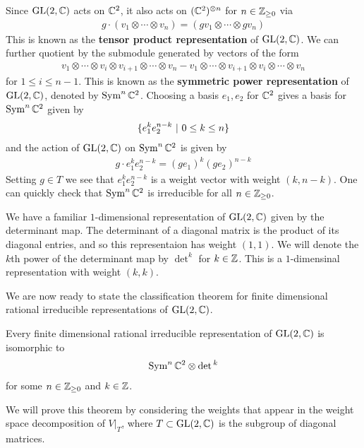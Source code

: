 \documentclass[12pt]{article}
\begin{document}
\begin{example}
Since $\operatorname{GL}(2,\mathbb{C})$ acts on $\mathbb{C}^2$, it also acts on $(\mathbb{C}^2)^{\otimes n}$ for $n\in \mathbb{Z}_{\geq 0}$ via \begin{align*}
    g\cdot (v_1\otimes \cdots \otimes v_n) = (gv_1\otimes \cdots \otimes gv_n)
\end{align*} This is known as the \textbf{tensor product representation} of $\operatorname{GL}(2,\mathbb{C})$. We can further 
quotient by the submodule generated by vectors of the form \begin{align*}
    v_1\otimes \cdots \otimes v_i \otimes v_{i+1} \otimes \cdots \otimes v_n - v_1\otimes \cdots \otimes v_{i+1} \otimes v_i \otimes \cdots \otimes v_n
\end{align*} for $1\leq i \leq n-1$. This is known as the \textbf{symmetric power representation} of $\operatorname{GL}(2,\mathbb{C})$, denoted by $\operatorname{Sym}^n\mathbb{C}^2$.
Choosing a basis $e_1,e_2$ for $\mathbb{C}^2$ gives a basis for $\operatorname{Sym}^n\mathbb{C}^2$ given by \begin{align*}
    \{e_1^ke_2^{n-k} \ \vert \  0\leq k \leq n\}
\end{align*} and the action of $\operatorname{GL}(2,\mathbb{C})$ on $\operatorname{Sym}^n\mathbb{C}^2$ is given by \begin{align*}
g\cdot e_1^ke_2^{n-k} = (ge_1)^k(ge_2)^{n-k}
\end{align*} Setting $g\in T$ we see that $e_1^ke_2^{n-k}$ is a weight vector with weight $(k,n-k)$. One 
can quickly check that $\operatorname{Sym}^n\mathbb{C}^2$ is irreducible for all $n\in \mathbb{Z}_{\geq 0}$.
\end{example}

\begin{example}
    We have a familiar $1$-dimensional representation of $\operatorname{GL}(2,\mathbb{C})$ given by the determinant map. The determinant of a diagonal matrix is the product of its diagonal entries,
    and so this representaion has weight $(1,1)$. We will denote 
    the $k$th power of the determinant map by $\det^k$ for $k\in\mathbb{Z}$. This is a $1$-dimensinal representation with weight $(k,k)$.
\end{example}

We are now ready to state the classification theorem for finite dimensional rational irreducible representations of $\operatorname{GL}(2,\mathbb{C})$.
\begin{theorem}
Every finite dimensional rational irreducible representation of $\operatorname{GL}(2,\mathbb{C})$ is isomorphic to \begin{align*}
    \operatorname{Sym}^n\mathbb{C}^2 \otimes \det{}^k
\end{align*} for some $n\in \mathbb{Z}_{\geq 0}$ and $k\in \mathbb{Z}$.
\end{theorem}
We will prove this theorem by considering the weights that appear in the weight space decomposition of $V\vert_{T}$, where $T\subset \operatorname{GL}(2,\mathbb{C})$ is the subgroup of diagonal matrices.
\end{document}
